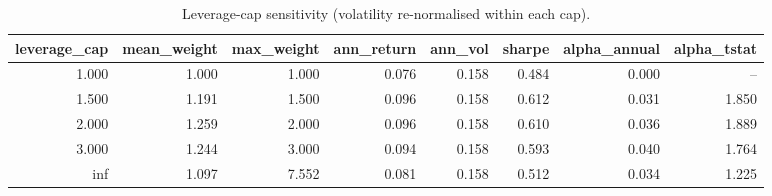 \begin{table}[htbp]
\centering
\caption{Leverage-cap sensitivity (volatility re-normalised within each cap).}
\label{tab:leverage}
\small
\begin{tabular}{rrrrrrrr}
\toprule
leverage\_cap & mean\_weight & max\_weight & ann\_return & ann\_vol & sharpe & alpha\_annual & alpha\_tstat \\
\midrule
1.000 & 1.000 & 1.000 & 0.076 & 0.158 & 0.484 & 0.000 & -- \\
1.500 & 1.191 & 1.500 & 0.096 & 0.158 & 0.612 & 0.031 & 1.850 \\
2.000 & 1.259 & 2.000 & 0.096 & 0.158 & 0.610 & 0.036 & 1.889 \\
3.000 & 1.244 & 3.000 & 0.094 & 0.158 & 0.593 & 0.040 & 1.764 \\
inf & 1.097 & 7.552 & 0.081 & 0.158 & 0.512 & 0.034 & 1.225 \\
\bottomrule
\end{tabular}
\end{table}
